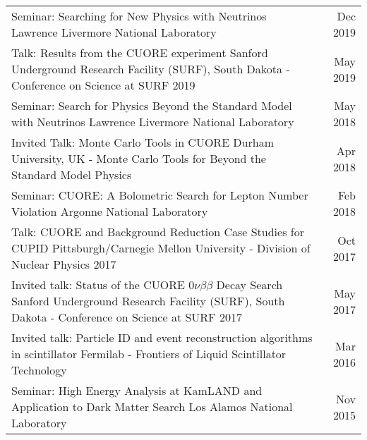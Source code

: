 \documentclass[11pt]{article} %
\begin{document}
\noindent\begin{tabularx}{\linewidth}{@{{}\textbullet\enskip}X@{\quad}r@{}}
Seminar: Searching for New Physics with Neutrinos \newline Lawrence Livermore National Laboratory & Dec 2019\\

\addlinespace[5pt]
Talk: Results from the CUORE experiment \newline Sanford Underground Research Facility (SURF), South Dakota - Conference on Science at SURF 2019 & May 2019\\

\addlinespace[5pt]
Seminar: Search for Physics Beyond the Standard Model with Neutrinos \newline Lawrence Livermore National Laboratory & May 2018\\

\addlinespace[5pt]
Invited Talk: Monte Carlo Tools in CUORE \newline Durham University, UK - Monte Carlo Tools for Beyond the Standard Model Physics & Apr 2018 \\

\addlinespace[5pt]
Seminar: CUORE: A Bolometric Search for Lepton Number Violation \newline Argonne National Laboratory & Feb 2018 \\

\addlinespace[5pt]
Talk: CUORE and Background Reduction Case Studies for CUPID \newline Pittsburgh/Carnegie Mellon University - Division of Nuclear Physics 2017 & Oct 2017 \\

\addlinespace[5pt]
Invited talk: Status of the CUORE $0\nu\beta\beta$ Decay Search \newline Sanford Underground Research Facility (SURF), South Dakota - Conference on Science at SURF 2017 & May 2017 \\

\addlinespace[5pt]
Invited talk: Particle ID and event reconstruction algorithms in scintillator \newline Fermilab - Frontiers of Liquid Scintillator Technology & Mar 2016 \\

\addlinespace[5pt]
Seminar: High Energy Analysis at KamLAND and Application to Dark Matter Search \newline Los Alamos National Laboratory & Nov 2015 \\


\end{tabularx}
\end{document}
